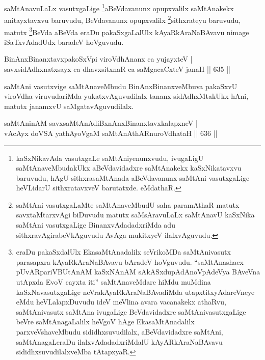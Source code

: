 \begin{artha}
saMtAnavuLaLx vasutxgaLige \footnote{kaSxNikavAda vasutxgaLe saMtAniyenunxvudu, ivugaLigU saMtAnaveMbudakUkx aBeVdavidadxre saMtAnakekx kaSxNikatavxvu baruvudu, hAgU sithxrasaMtAnada aBeVdavanunx saMtAni vasutxgaLige heVLidarU sithxratavxveV barutatxde. eMdathaR.}aBeVdavanunx opupxvalilx saMtAnakekx anitayxtavxvu baruvudu, BeVdavanunx opupxvalilx \footnote{saMtAni vasutxgaLaMte saMtAnaveMbudU saha paramAthaR matutx savxtaMtarxvAgi biDuvudu matutx saMsAravuLaLx saMtAnavU kaSxNika saMtAni vasutxgaLige BinanxvAdadadxriMda adu sithxravAgirabeVkAguvudu AvAga mukitxyeV ilalxvAguvudu.}sithxrateyu baruvudu, matutx \footnote{eraDu pakaSxdalUlx EkasaMtAnadalilx seVrikoMDa saMtAnivasutx parasapxra kAyaRkAraNaBAvavu bAradeV hoVguvudu. ``saMtAnashacx pUvARpariVBUtAnAM kaSxNAnAM sAkASxdupAdAnoVpAdeVya BAveVna utApxda EvoV cayxta iti'' saMtAnaveMdare hiMdu muMdina kaSxNavasutxgaLige neVrakAyaRkAraNaBAvadiMda utapxtitxyAdareVneye eMdu heVLalapxDuvudu ideV meVlina avara vacanakekx athaRvu, saMtAnivasutx saMtAna ivugaLige BeVdavidadxre saMtAnivasutxgaLige beVre saMtAnagaLalilx heVgoV hAge EkasaMtAnadalilx parxveVshaveMbudu sididhxsuvudilalx, aBeVdavidadxre saMtAni, saMtAnagaLeraDu ilalxvAdadadxriMdalU kAyARkAraNaBAvavu sididhxsuvudilalxveMba tAtapxyaR.}BeVda aBeVda eraDu pakaSxgaLalUlx kAyaRkAraNaBAvavu nimage iSaTxvAdadUdx baradeV hoVguvudu.
\end{artha}


\begin{shl}
BinAnxBinanxtavxpakoSxV\s pi \footnotemark[3]viroVdhAnanx ca yujayxteV | \\
savxsidAdhxnatxsayx ca dhavxsitxnaR ca saMgacaCxteV janaH \hfill||  635 ||  
\end{shl}

\begin{artha}
saMtAni vasutxvige saMtAnaveMbudu BinAnxBinanxveMbuva pakaSxvU viroVdha viruvudariMda yukatxvAguvudilalx tananx sidAdhxMtakUkx hAni, matutx janamxvU saMgatavAguvudilalx.
\end{artha}

\begin{shl}
saMtAninAM savxsaMtAnAdiBxnAnxBinanxtavxkalapxneV | \\
vAcAyx doVSA yathAyoVgaM saMtAnAthARnuroVdhataH \hfill ||  636 ||  
\end{shl}

